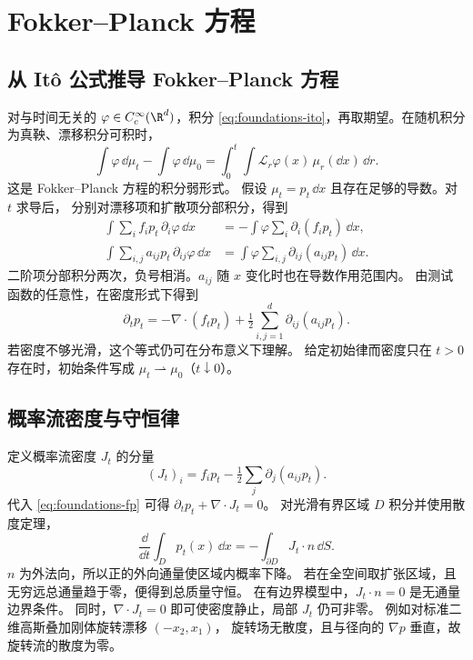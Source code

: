 \section{Fokker--Planck 方程}

\subsection{从 Itô 公式推导 Fokker--Planck 方程\requiredderivation}

对与时间无关的 \(\varphi\in C_c^\infty(\R^d)\)，积分
\eqref{eq:foundations-ito}，再取期望。在随机积分为真鞅、漂移积分可积时，
\begin{equation}
  \int\varphi\,\dd\mu_t-\int\varphi\,\dd\mu_0
    =\int_0^t\int\mathcal L_r\varphi(x)\,\mu_r(\dd x)\,\dd r .
  \label{eq:foundations-fp-weak}
\end{equation}
这是 Fokker--Planck 方程的积分弱形式。
假设 \(\mu_t=p_t\,\dd x\) 且存在足够的导数。对 \(t\) 求导后，
分别对漂移项和扩散项分部积分，得到
\begin{align*}
  \int \sum_i f_i p_t\,\partial_i\varphi\,\dd x
    &=-\int\varphi\sum_i\partial_i(f_i p_t)\,\dd x,\\
  \int \sum_{i,j}a_{ij}p_t\,\partial_{ij}\varphi\,\dd x
    &=\int\varphi\sum_{i,j}\partial_{ij}(a_{ij}p_t)\,\dd x .
\end{align*}
二阶项分部积分两次，负号相消。\(a_{ij}\) 随 \(x\) 变化时也在导数作用范围内。
由测试函数的任意性，在密度形式下得到
\begin{equation}
  \boxed{
  \partial_t p_t=-\nabla\cdot(f_tp_t)
     +\tfrac12\sum_{i,j=1}^d\partial_{ij}(a_{ij}p_t).}
  \label{eq:foundations-fp}
\end{equation}
若密度不够光滑，这个等式仍可在分布意义下理解。
给定初始律而密度只在 \(t>0\) 存在时，初始条件写成
\(\mu_t\rightharpoonup\mu_0\)（\(t\downarrow0\)）。

\subsection{概率流密度与守恒律}

定义概率流密度 \(J_t\) 的分量
\begin{equation}
  (J_t)_i=f_i p_t-\tfrac12\sum_j\partial_j(a_{ij}p_t).
  \label{eq:foundations-current}
\end{equation}
代入 \eqref{eq:foundations-fp} 可得 \(\partial_t p_t+\nabla\cdot J_t=0\)。
对光滑有界区域 \(D\) 积分并使用散度定理，
\[
  \frac{\dd}{\dd t}\int_D p_t(x)\,\dd x
    =-\int_{\partial D}J_t\cdot n\,\dd S .
\]
\(n\) 为外法向，所以正的外向通量使区域内概率下降。
若在全空间取扩张区域，且无穷远总通量趋于零，便得到总质量守恒。
在有边界模型中，\(J_t\cdot n=0\) 是无通量边界条件。
同时，\(\nabla\cdot J_t=0\) 即可使密度静止，局部 \(J_t\) 仍可非零。
例如对标准二维高斯叠加刚体旋转漂移 \((-x_2,x_1)\)，
旋转场无散度，且与径向的 \(\nabla p\) 垂直，故旋转流的散度为零。

